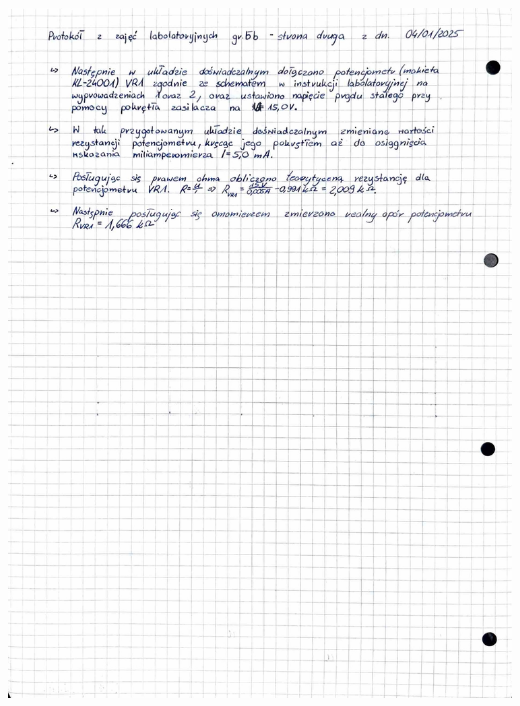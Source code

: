 \documentclass[,a4paper,12pt]{article}
\begin{document}
    \includegraphics[height=\textheight, width= \linewidth]{Adobe Scan 16 sty 2025 (1)-2.jpg}
    
\end{document}
